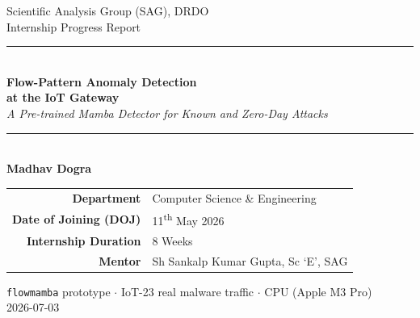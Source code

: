 \documentclass[11pt,a4paper]{article}
\begin{document}
\begin{titlepage}
\centering
\vspace*{1.1cm}
{\large\textcolor{neutral}{Scientific Analysis Group (SAG), DRDO}}\\[0.25cm]
{\small\textcolor{neutral}{Internship Progress Report}}\\[0.9cm]
{\color{cool}\rule{\linewidth}{1.4pt}}\\[0.5cm]
{\LARGE\bfseries\color{cool} Flow-Pattern Anomaly Detection\\[5pt] at the IoT Gateway}\\[0.55cm]
{\large\itshape A Pre-trained Mamba Detector for Known and Zero-Day Attacks}\\[0.4cm]
{\color{cool}\rule{\linewidth}{0.7pt}}\\[1.5cm]
{\Large\textbf{Madhav Dogra}}\\[1.7cm]
{\renewcommand{\arraystretch}{1.5}
\begin{tabular}{@{}r@{\quad}l@{}}
\textcolor{accent}{\textbf{Department}} & Computer Science \& Engineering \\
\textcolor{accent}{\textbf{Date of Joining (DOJ)}} & 11\textsuperscript{th} May 2026 \\
\textcolor{accent}{\textbf{Internship Duration}} & 8 Weeks \\
\textcolor{accent}{\textbf{Mentor}} & Sh Sankalp Kumar Gupta, Sc `E', SAG \\
\end{tabular}\par}
\vfill
{\small\textcolor{neutral}{\texttt{flowmamba} prototype \;$\cdot$\; IoT-23 real malware traffic \;$\cdot$\; CPU (Apple M3 Pro)}}\\[0.4cm]
{\small\textcolor{neutral}{2026-07-03}}
\end{titlepage}
\end{document}
